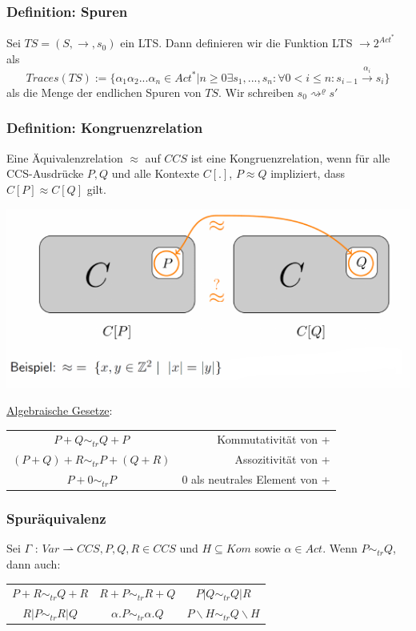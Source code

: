 \documentclass[a4paper,10pt, oneside]{book}
\begin{document}
\subsubsection*{Definition: Spuren}
Sei $TS = (S,\rightarrow,s_0)$ ein LTS. Dann definieren wir die Funktion LTS $\rightarrow 2^{Act^*}$ als 
\begin{equation*}
Traces(TS) := \{\alpha_1\alpha_2...\alpha_n \in Act^* | n \geq 0 \exists s_1, ... , s_n : \forall 0 < i \leq n : s_{i-1} \xrightarrow{\alpha_i} s_i\}
\end{equation*}
als die Menge der endlichen Spuren von $TS$. Wir schreiben $s_0 \rightsquigarrow^{\varrho} s'$

\subsubsection*{Definition: Kongruenzrelation}
Eine Äquivalenzrelation $\approx$ auf $CCS$ ist eine Kongruenzrelation, wenn für alle CCS-Ausdrücke $P, Q$ und alle Kontexte $C[.]$, $P \approx Q$ impliziert, dass $C[P] \approx C[Q]$ gilt.

\begin{center}
\includegraphics[scale=0.6]{kongruenzrelation}
\end{center}

\underline{Algebraische Gesetze}:\\
\begin{center}
\begin{tabular}{ c r }
 $P + Q \sim_{tr} Q + P$ & Kommutativität von +\\
 $(P + Q) + R \sim_{tr} P + (Q + R)$ & Assozitivität von +\\
 $P + 0 \sim_{tr} P$ & 0 als neutrales Element von +\\
\end{tabular}
\end{center}

\subsubsection{Spuräquivalenz}
Sei $\Gamma$ : $Var \rightharpoonup CCS, P, Q, R \in CCS$ und $H \subseteq Kom$ sowie $\alpha \in Act$. Wenn $P \sim_{tr} Q$, dann auch:
\begin{center}
\begin{tabular}{c c c}
$P + R \sim_{tr} Q + R$ & \quad\quad $R + P \sim_{tr} R + Q$ & \quad\quad $P | Q \sim_{tr} Q | R$\\
$R | P \sim_{tr} R | Q$ & $\alpha.P \sim_{tr} \alpha.Q$ & $P\backslash H \sim_{tr} Q\backslash H$
\end{tabular}
\end{center}
\end{document}
